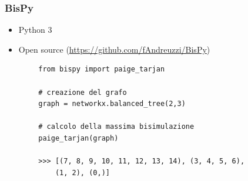 \documentclass{beamer}
\begin{document}
\begin{frame}[fragile]\frametitle{BisPy}
    \begin{itemize}
        \item Python 3
        \item Open source (\url{https://github.com/fAndreuzzi/BisPy})
    \end{itemize}


    \begin{example}
        \begin{verbatim}
        from bispy import paige_tarjan

        # creazione del grafo
        graph = networkx.balanced_tree(2,3)

        # calcolo della massima bisimulazione
        paige_tarjan(graph)

        >>> [(7, 8, 9, 10, 11, 12, 13, 14), (3, 4, 5, 6),
            (1, 2), (0,)]
        \end{verbatim}
    \end{example}
\end{frame}
\end{document}
